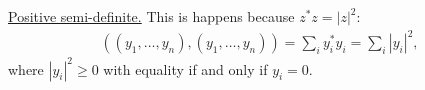 \underline{Positive semi-definite.} This is happens because \(z^*z = |z|^2\):
\begin{align}
  \label{eq:positive-semi-definite-check}
  ((y_1, \ldots, y_n), (y_1, \ldots, y_n)) = \sum_i y_i^*y_i = \sum_i |y_i|^2,
\end{align}
where \(|y_i|^2 \ge 0\) with equality if and only if \(y_i = 0\).










